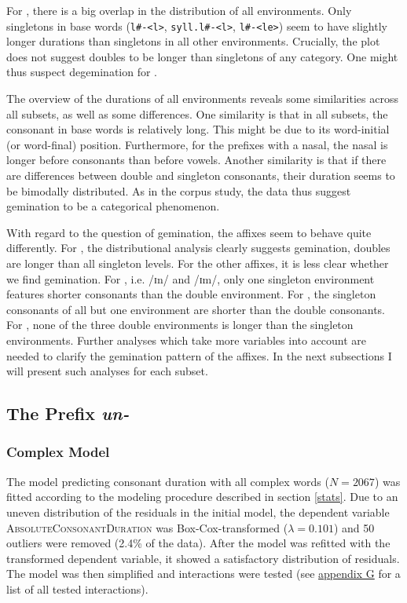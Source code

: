 
For , there is a big overlap in the distribution of all environments. Only singletons in base words (\texttt{l\#-<l>}, \texttt{syll.l\#-<l>}, \texttt{l\#-<le>}) seem to have slightly longer durations than singletons in all other environments. Crucially, the plot does not suggest doubles to be longer than singletons of any category. One might thus suspect degemination for . 

The overview of the durations of all environments reveals some similarities across all subsets, as well as some differences. 
One similarity is that in all subsets, the consonant in base words is relatively long. This might be due to its word-initial (or word-final) position. 
Furthermore, for the prefixes with a nasal, the nasal is longer before consonants than before vowels. 
Another similarity is that if there are differences between double and singleton consonants, their duration seems to be bimodally distributed. As in the corpus study, the data thus suggest gemination to be a categorical phenomenon.

With regard to the question of gemination, the affixes seem to behave quite differently. For , the distributional analysis clearly suggests gemination, doubles are longer than all singleton levels. 
For the other affixes, it is less clear whether we find gemination. For , i.e. /ɪn/ and /ɪm/, only one singleton environment features shorter consonants than the double environment.
For , the singleton consonants of all but one environment are shorter than the double consonants. 
For , none of the three double environments is longer than the singleton environments. Further analyses which take more variables into account are needed to clarify the gemination pattern of the affixes. 
 In the next subsections I will present such analyses for each subset.


\subsection{The Prefix \textit{un-}} \label{un experiment}

\subsubsection{Complex Model}


The model predicting consonant duration with all complex words ($N=2067$) was fitted according to the modeling procedure described in section \ref{stats}. Due to an uneven distribution of the residuals in the initial model, the dependent variable \textsc{AbsoluteConsonantDuration} was Box-Cox-transformed ($\lambda = 0.101$) and 50 outliers were removed (2.4\% of the data).
 After the model was refitted with the transformed dependent variable, it showed a satisfactory distribution of residuals.  The model was then simplified and interactions were tested (see \hyperref[Appendix G Summaries of tested interactions in experimental study]{appendix G} for a list of all tested interactions).
 
